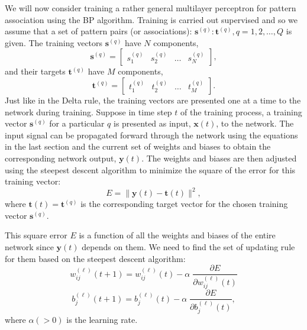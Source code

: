 \documentclass[fleqn]{article}
\begin{document}
We will now consider training a rather general multilayer perceptron for pattern association
using the BP algorithm.
Training is carried out supervised and so we assume that a set of pattern pairs
(or associations):
$\mathbf s^{(q)}: \mathbf t^{(q)}, q=1, 2, \ldots, Q$
is given.
The training vectors $\mathbf s^{(q)}$ have $N$ components,
\[
\mathbf s^{(q)} =
\left[
\begin{array}{cccc}
s_1^{(q)} & s_2^{(q)} & \ldots & s_N^{(q)}
\end{array}
\right],
\]
and their targets $\mathbf t^{(q)}$ have $M$ components,
\[
\mathbf t^{(q)} =
\left[
\begin{array}{cccc}
t_1^{(q)} & t_2^{(q)} & \ldots & t_M^{(q)}
\end{array}
\right].
\]
Just like in the Delta rule,
the training vectors are presented one at a time to the network during training.
Suppose in time step $t$ of the training process,
a training vector $\mathbf s^{(q)}$ for a particular $q$ is presented as input,
$\mathbf x(t)$, to the network.
The input signal can be propagated forward through the network using the equations in the last section
and the current set of weights and biases to obtain the corresponding network output, $\mathbf y(t)$.
The weights and biases are then adjusted using the steepest descent algorithm to minimize
the square of the error for this training vector:
\[
E = \| \mathbf y(t) - \mathbf t(t) \|^2,
\]
where $\mathbf t(t) = \mathbf t^{(q)}$
is the corresponding target vector for the chosen training vector $\mathbf s^{(q)}$.

This square error $E$ is a function of all the weights and biases of the entire network
since $\mathbf y(t)$ depends on them.
We need to find the set of updating rule for them based on the steepest descent algorithm:
\[
w_{ij}^{(\ell)}(t+1) = w_{ij}^{(\ell)}(t) - \alpha \; \frac{\partial E}{\partial w_{ij}^{(\ell)}(t)}
\]
\[
b_{j}^{(\ell)}(t+1) = b_{j}^{(\ell)}(t) - \alpha \; \frac{\partial E}{\partial b_{j}^{(\ell)}(t)},
\]
where $\alpha (>0)$ is the learning rate.
\end{document}
